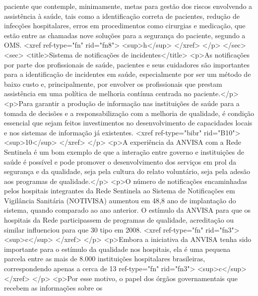         paciente que contemple, minimamente, metas para gestão dos riscos envolvendo a assistência à
        saúde, tais como a identificação correta de pacientes, redução de infecções hospitalares,
        erros em procedimentos como cirurgias e medicação, que estão entre as chamadas nove soluções
        para a segurança do paciente, segundo a OMS. <xref ref-type="fn" rid="fn8">
          <sup>h</sup>
        </xref>
      </p>
    </sec>
    <sec>
      <title>Sistema de notificações de incidentes</title>
      <p>As notificações por parte dos profissionais de saúde, pacientes e seus cuidadores são
        importantes para a identificação de incidentes em saúde, especialmente por ser um método de
        baixo custo e, principalmente, por envolver os profissionais que prestam assistência em uma
        política de melhoria contínua centrada no paciente.</p>
      <p>Para garantir a produção de informação nas instituições de saúde para a tomada de decisões
        e a responsabilização com a melhoria de qualidade, é condição essencial que sejam feitos
        investimentos no desenvolvimento de capacidades locais e nos sistemas de informação já
        existentes. <xref ref-type="bibr" rid="B10">
          <sup>10</sup>
        </xref>
      </p>
      <p>A experiência da ANVISA com a Rede Sentinela é um bom exemplo de que a interação entre
        governo e instituições de saúde é possível e pode promover o desenvolvimento dos serviços em
        prol da segurança e da qualidade, seja pela cultura do relato voluntário, seja pela adesão
        aos programas de qualidade.</p>
      <p>O número de notificações encaminhadas pelos hospitais integrantes da Rede Sentinela ao
        Sistema de Notificações em Vigilância Sanitária (NOTIVISA) aumentou em 48,8%
        ano de implantação do sistema, quando comparado ao ano anterior. O estímulo da ANVISA para
        que os hospitais da Rede participassem de programas de qualidade, acreditação ou similar
        influenciou para que 30%
        tipo em 2008. <xref ref-type="fn" rid="fn3">
          <sup>c</sup>
        </xref>
      </p>
      <p>Embora a iniciativa da ANVISA tenha sido importante para o estímulo da qualidade nos
        hospitais, ela é uma pequena parcela entre as mais de 8.000 instituições hospitalares
        brasileiras, correspondendo apenas a cerca de 13%
          ref-type="fn" rid="fn3">
          <sup>c</sup>
        </xref>
      </p>
      <p>Por esse motivo, o papel dos órgãos governamentais que recebem as informações sobre os
